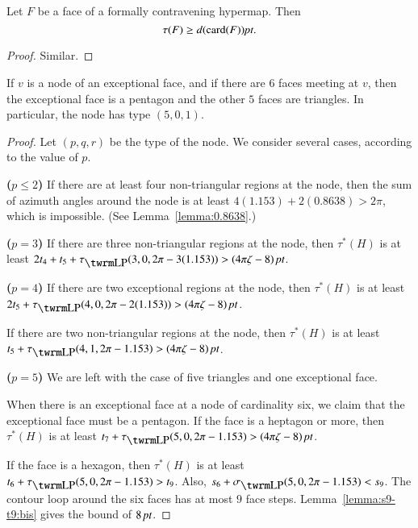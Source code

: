 \begin{lemma}
    \label{proposition:wttau}
    Let $F$ be a face of a formally contravening hypermap.
    Then
    $$\tau(F) \ge d({\operatorname{card}}(F))\hbox{\it pt}.$$
\end{lemma}

\begin{proof} Similar.
\end{proof}

\begin{lemma}  If $v$  is a node of an exceptional face,
and if there are $6$ faces meeting at $v$, then the exceptional face
is a pentagon and the other $5$ faces are triangles.  In particular,
the node has type $(5,0,1)$.
\end{lemma}

\begin{proof}  Let $(p,q,r)$ be the type of the node.  We consider
several cases, according to the value of $p$.

{\bf($p\le2$)} If there are at least four non-triangular regions at
the node, then the sum of azimuth angles around the node is at least
$4(1.153)+2(0.8638)>2\pi$, which is impossible.  (See
Lemma~\ref{lemma:0.8638}.)

{\bf($p=3$)} If there are three non-triangular regions at the node,
then $\tau^*(H)$ is at least
$2t_4+t_5+\tauLP(3,0,2\pi-3(1.153))>\squander$.

{\bf($p=4$)} If there are two exceptional regions at the node, then
$\tau^*(H)$ is at least $2t_5+\tauLP(4,0,2\pi-2(1.153))>\squander$.

If there are two non-triangular regions at the node, then
$\tau^*(H)$ is at least  $t_5+\tauLP(4,1,2\pi-1.153)>\squander$.

{\bf($p=5$)} We are left with the case of five triangles and one
exceptional face.

When there is an exceptional face at a node of cardinality six, we
claim that the exceptional face must be a pentagon. If the face is a
heptagon or more, then $\tau^*(H)$ is at least
$t_7+\tauLP(5,0,2\pi-1.153) > \squander$.

If the face is a hexagon, then $\tau^*(H)$ is at least $t_6 +
\tauLP(5,0,2\pi-1.153) > t_9$. Also, $s_6+\sLP(5,0,2\pi-1.153) <
s_9$. The contour loop around the six faces has at most $9$ face
steps. Lemma~\ref{lemma:s9-t9:bis} gives the bound of $8\,\hbox{\it pt}$.
\end{proof}


